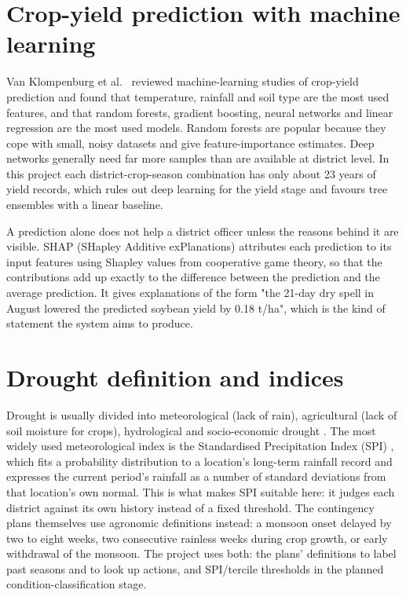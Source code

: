 \section{Crop-yield prediction with machine learning}
Van Klompenburg et al.\ \cite{vanklompenburg2020crop} reviewed machine-learning studies of crop-yield prediction and found that temperature, rainfall and soil type are the most used features, and that random forests, gradient boosting, neural networks and linear regression are the most used models. Random forests \cite{breiman2001random} are popular because they cope with small, noisy datasets and give feature-importance estimates. Deep networks generally need far more samples than are available at district level. In this project each district-crop-season combination has only about 23 years of yield records, which rules out deep learning for the yield stage and favours tree ensembles with a linear baseline.

A prediction alone does not help a district officer unless the reasons behind it are visible. SHAP (SHapley Additive exPlanations) \cite{lundberg2017unified} attributes each prediction to its input features using Shapley values from cooperative game theory, so that the contributions add up exactly to the difference between the prediction and the average prediction. It gives explanations of the form "the 21-day dry spell in August lowered the predicted soybean yield by 0.18 t/ha", which is the kind of statement the system aims to produce.

\section{Drought definition and indices}
Drought is usually divided into meteorological (lack of rain), agricultural (lack of soil moisture for crops), hydrological and socio-economic drought \cite{mishra2010review}. The most widely used meteorological index is the Standardised Precipitation Index (SPI) \cite{mckee1993relationship}, which fits a probability distribution to a location's long-term rainfall record and expresses the current period's rainfall as a number of standard deviations from that location's own normal. This is what makes SPI suitable here: it judges each district against its own history instead of a fixed threshold. The contingency plans themselves use agronomic definitions instead: a monsoon onset delayed by two to eight weeks, two consecutive rainless weeks during crop growth, or early withdrawal of the monsoon. The project uses both: the plans' definitions to label past seasons and to look up actions, and SPI/tercile thresholds in the planned condition-classification stage.

